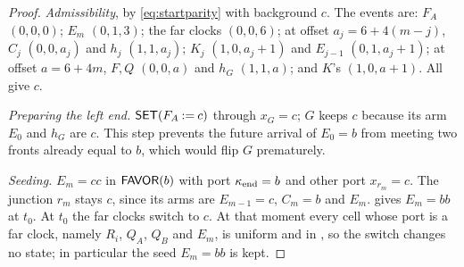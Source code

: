 \begin{proof}
\emph{Admissibility}, by \eqref{eq:startparity} with background $c$. The events are: $F_A$
$(0,0,0)$; $E_m$ $(0,1,3)$; the far clocks $(0,0,6)$; at offset $a_j=6+4(m-j)$, $C_j$ $(0,0,a_j)$
and $h_j$ $(1,1,a_j)$; $K_j$ $(1,0,a_j+1)$ and $E_{j-1}$ $(0,1,a_j+1)$; at offset $a=6+4m$, $F,Q$
$(0,0,a)$ and $h_G$ $(1,1,a)$; and $K$'s $(1,0,a+1)$. All give $c$.

\emph{Preparing the left end.} $\textsf{SET}(F_A\mathbin{:=}c)$ through $x_G=c$; $G$ keeps $c$ because
its arm $E_0$ and $h_G$ are $c$. This step prevents the future arrival of $E_0=b$ from meeting two
fronts already equal to $b$, which would flip $G$ prematurely.

\emph{Seeding.} $E_m=cc$ in $\textsf{FAVOR}(b)$ with port $\kappa_{\mathrm{end}}=b$ and other port $x_{r_m}=c$. The junction
$r_m$ stays $c$, since its arms are $E_{m-1}=c$, $C_m=b$ and $E_m$.  gives $E_m=bb$ at
$t_0$. At $t_0$ the far clocks switch to $c$. At that moment every cell whose port is a far clock,
namely $R_i$, $Q_A$, $Q_B$ and $E_m$, is uniform and in \HOLD, so the switch changes no state; in
particular the seed $E_m=bb$ is kept.


\end{proof}
